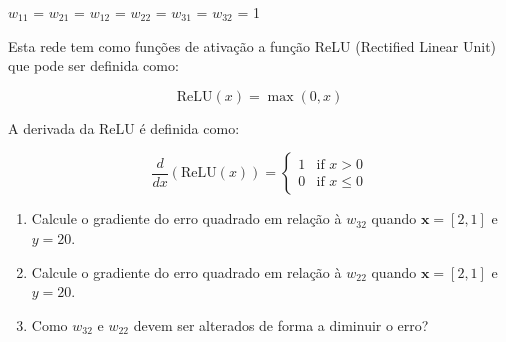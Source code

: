 \documentclass{article}
\begin{document}
\begin{enumerate}
\begin{figure}[!ht]
    \end{figure}

    $w_{11}$ = $w_{21}$ = $w_{12}$ = $w_{22}$ = $w_{31}$ = $w_{32}$ = 1

    Esta rede tem como funções de ativação a função ReLU (Rectified Linear Unit) que pode ser definida como:

    \begin{equation}
        \text{ReLU}(x) = \max(0, x)
    \end{equation}

    A derivada da ReLU é definida como:

    \begin{equation}
            \frac{d}{dx}(\text{ReLU}(x)) =
            \begin{cases}
            1 & \text{if } x > 0 \\
            0 & \text{if } x \leq 0
            \end{cases}            
    \end{equation}


    \begin{enumerate}
        \item Calcule o gradiente do erro quadrado em relação à $w_{32}$ quando $\mathbf{x} = [2,1]$ e $y = 20$.
        \item Calcule o gradiente do erro quadrado em relação à $w_{22}$ quando $\mathbf{x} = [2,1]$ e $y = 20$. 
        \item Como $w_{32}$ e $w_{22}$ devem ser alterados de forma a diminuir o erro?   
    \end{enumerate}
    


\end{enumerate}
\end{document}
